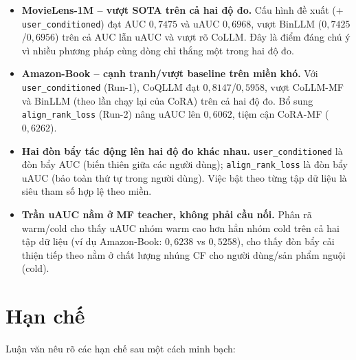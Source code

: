 \begin{itemize}
    \item \textbf{MovieLens-1M -- vượt SOTA trên cả hai độ đo.} Cấu hình đề xuất
    (+ \texttt{user\_conditioned}) đạt AUC $0{,}7475$ và uAUC $0{,}6968$, vượt BinLLM
    ($0{,}7425$/$0{,}6956$) trên cả AUC lẫn uAUC và vượt rõ CoLLM. Đây là điểm đáng chú ý
    vì nhiều phương pháp cùng dòng chỉ thắng một trong hai độ đo.

    \item \textbf{Amazon-Book -- cạnh tranh/vượt baseline trên miền khó.} Với
    \texttt{user\_conditioned} (Run-1), CoQLLM đạt $0{,}8147$/$0{,}5958$, vượt CoLLM-MF và
    BinLLM (theo lần chạy lại của CoRA) trên cả hai độ đo. Bổ sung \texttt{align\_rank\_loss}
    (Run-2) nâng uAUC lên $0{,}6062$, tiệm cận CoRA-MF ($0{,}6262$).

    \item \textbf{Hai đòn bẩy tác động lên hai độ đo khác nhau.} \texttt{user\_conditioned}
    là đòn bẩy AUC (biến thiên giữa các người dùng); \texttt{align\_rank\_loss} là đòn bẩy
    uAUC (bảo toàn thứ tự trong người dùng). Việc bật theo từng tập dữ liệu là siêu tham số
    hợp lệ theo miền.

    \item \textbf{Trần uAUC nằm ở MF teacher, không phải cầu nối.} Phân rã warm/cold cho
    thấy uAUC nhóm warm cao hơn hẳn nhóm cold trên cả hai tập dữ liệu (ví dụ Amazon-Book:
    $0{,}6238$ vs $0{,}5258$), cho thấy đòn bẩy cải thiện tiếp theo nằm ở chất lượng nhúng CF
    cho người dùng/sản phẩm nguội (cold).
\end{itemize}

\section{Hạn chế}
\label{sec:han-che-ch5}

Luận văn nêu rõ các hạn chế sau một cách minh bạch:

